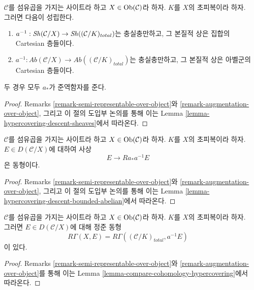 \begin{lemma}
\label{lemma-hypercovering-X-descent-sheaves}
$\mathcal{C}$를 섬유곱을 가지는 사이트라 하고
$X \in \mathop{\mathrm{Ob}}\nolimits(\mathcal{C})$라 하자. $K$를 $X$의 초피복이라 하자.
그러면 다음이 성립한다.
\begin{enumerate}
\item $a^{-1} : \mathop{\mathit{Sh}}\nolimits(\mathcal{C}/X) \to
\mathop{\mathit{Sh}}\nolimits((\mathcal{C}/K)_{total})$는 충실충만하고, 그 본질적 상은
집합의 Cartesian 층들이다.
\item $a^{-1} : \textit{Ab}(\mathcal{C}/X) \to
\textit{Ab}((\mathcal{C}/K)_{total})$는 충실충만하고, 그 본질적 상은
아벨군의 Cartesian 층들이다.
\end{enumerate}
두 경우 모두 $a_*$가 준역함자를 준다.
\end{lemma}

\begin{proof}
Remarks \ref{remark-semi-representable-over-object}와
\ref{remark-augmentation-over-object}, 그리고 이 절의 도입부 논의를
통해 이는 Lemma \ref{lemma-hypercovering-descent-sheaves}에서 따라온다.
\end{proof}

\begin{lemma}
\label{lemma-hypercovering-X-descent-bounded-abelian}
$\mathcal{C}$를 섬유곱을 가지는 사이트라 하고
$X \in \mathop{\mathrm{Ob}}\nolimits(\mathcal{C})$라 하자. $K$를 $X$의 초피복이라 하자.
$E \in D(\mathcal{C}/X)$에 대하여 사상
$$
E \longrightarrow Ra_*a^{-1}E
$$
은 동형이다.
\end{lemma}

\begin{proof}
Remarks \ref{remark-semi-representable-over-object}와
\ref{remark-augmentation-over-object}, 그리고 이 절의 도입부 논의를
통해 이는 Lemma
\ref{lemma-hypercovering-descent-bounded-abelian}에서 따라온다.
\end{proof}

\begin{lemma}
\label{lemma-compare-cohomology-hypercovering-X}
$\mathcal{C}$를 섬유곱을 가지는 사이트라 하고
$X \in \mathop{\mathrm{Ob}}\nolimits(\mathcal{C})$라 하자. $K$를 $X$의 초피복이라 하자.
그러면 $E \in D(\mathcal{C}/X)$에 대해 정준 동형
$$
R\Gamma(X, E) = R\Gamma((\mathcal{C}/K)_{total}, a^{-1}E)
$$
이 있다.
\end{lemma}

\begin{proof}
Remarks \ref{remark-semi-representable-over-object}와
\ref{remark-augmentation-over-object}를 통해 이는 Lemma
\ref{lemma-compare-cohomology-hypercovering}에서 따라온다.
\end{proof}

